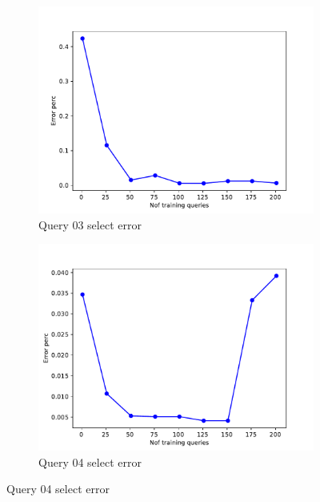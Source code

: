 \begin{figure}[!htb]
   \begin{subfigure}[t]{0.5\textwidth}
     \includegraphics[scale=0.4]{figs/tpch10/tpch10_sel03_error.pdf}
     \caption{Query 03 select error}
     \label{fig:tpch_sel03}
   \end{subfigure}
   \begin{subfigure}[t]{0.5\textwidth}
     \includegraphics[scale=0.4]{figs/tpch10/tpch10_sel04_error.pdf}
     \caption{Query 04 select error}
     \label{fig:tpch_sel04}
    \end{subfigure}


\end{figure}
